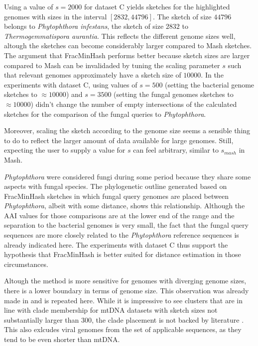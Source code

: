 Using a value of $s=2000$ for dataset C yields sketches for the highlighted
genomes with sizes in the interval $[2832, 44796]$. The sketch of size $44796$
belongs to \textit{Phytophthora infestans}, the sketch of size $2832$ to
\textit{Thermogemmatispora aurantia}. This reflects the different genome sizes
well, altough the sketches can become considerably larger compared to Mash
sketches. The argument that FracMinHash performs better because sketch sizes
are larger compared to Mash can be invalidaded by tuning the scaling parameter
$s$ such that relevant genomes approximately have a sketch size of $10000$. In
the experiments with dataset C, using values of $s=500$ (setting the bacterial
genome sketches to $\approx 10000$) and $s=3500$ (setting the fungal genomes
sketches to $\approx 10000$) didn't change the number of empty intersections of
the calculated sketches for the comparison of the fungal queries to
\textit{Phytophthora}. 

Moreover, scaling the sketch according to the genome size seems a sensible thing
to do to reflect the larger amount of data available for large genomes. Still,
expecting the user to supply a value for $s$ can feel arbitrary, similar to
$s_{mash}$ in Mash.

\textit{Phytophthora} were considered fungi during some period because they
share some aspects with fungal species. The phylogenetic outline generated based
on FracMinHash sketches in which fungal query genomes are placed between
\textit{Phytophthora}, albeit with some distance, shows this relationship.
Although the AAI values for those comparisons are at the lower end of the range
and the separation to the bacterial genomes is very small, the fact that the
fungal query sequences are more closely related to the \textit{Phytophthora}
reference sequences is already indicated here. The experiments with dataset C
thus support the hypothesis that FracMinHash is better suited for distance
estimation in those circumstances.

Altough the method is more sensitive for genomes with diverging genome sizes,
there is a lower boundary in terms of genome size. This observation was already
made in
\cite{irberLightweightCompositionalAnalysis2022,heraDebiasingFracMinHashDeriving2023}
and is repeated here. While it is impressive to see clusters that are in line
with clade membership for mtDNA datasets with sketch sizes not substantially
larger than $300$, the clade placement is not backed by literature
\cite{winkworthComparativeAnalysesComplete2022,abadPhytophthoraTaxonomicPhylogenetic2023a,
yangExpandedPhylogenyGenus2017}. This also exlcudes viral genomes from the set
of applicable sequences, as they tend to be even shorter  than mtDNA.

